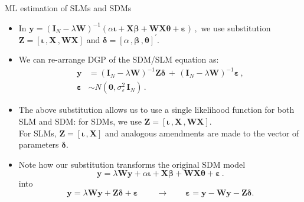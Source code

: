 \documentclass{beamer}
\begin{document}
\begin{frame}{ML estimation of SLMs and SDMs}
\begin{itemize}
    \item In $\bm{y} = (\bm{I}_{N} - \lambda \bm{W})^{-1} (\alpha \bm{\iota} + \bm{X \beta} + \bm{W\!X\theta}+ \bm{\varepsilon})\,,$ we use substitution $\bm{Z}=[\bm{\iota} \,, \bm{X} \,, \bm{W\!X}]$ and $\bm{\delta}= \left[ \alpha \,, \bm{\beta} \,, \bm{\theta} \right]^{'}$. 
    \smallskip
    \item We can re-arrange DGP of the SDM/SLM equation as: 
    \begin{equation*}
    \begin{aligned}
    \bm{y} &= (\bm{I}_{N} - \lambda \bm{W})^{-1} \bm{Z \delta} \, + \,
    (\bm{I}_{N} - \lambda \bm{W})^{-1} \bm{\varepsilon}\,, \\ 
    \bm{\varepsilon} &\sim N(\bm{0}, \sigma_{\varepsilon}^2 \, \bm{I}_{N})\,.
    \end{aligned}
    \end{equation*}
    \item The above substitution allows us to use a single likelihood function for both SLM and SDM: for SDMs, we use $\bm{Z}=[\bm{\iota} \,, \bm{X} \,, \bm{W\!X}]$. \\ \smallskip For SLMs, $\bm{Z}=[\bm{\iota} \,, \bm{X}]$ and analogous amendments are made to the vector of parameters $\bm{\delta}$.
    \smallskip
    \item Note how our substitution transforms the original SDM model
    \begin{equation*} 
    \bm{y} = \lambda \bm{W\!y} + \alpha \bm{\iota} + \bm{X \beta} + \bm{W\!X\theta} + \bm{\varepsilon}\,.
    \end{equation*}
    into
    \begin{equation*}
    \bm{y} = \lambda \bm{W\!y} + \bm{Z \delta} + \bm{\varepsilon}\, \qquad \rightarrow \qquad
    \bm{\varepsilon} = \bm{y} - \bm{W\!y} - \bm{Z \delta}.
    \end{equation*}
\end{itemize}
\end{frame}
\end{document}
